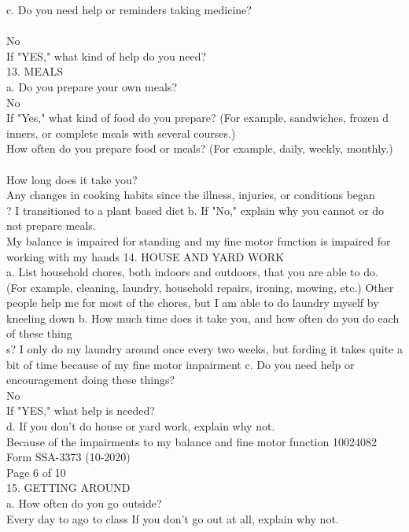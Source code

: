 \documentclass[12pt]{article}
\begin{document}
c. Do you need help or reminders taking medicine?\\\\
No\\
If "YES," what kind of help do you need?\\
13. MEALS\\
a. Do you prepare your own meals?\\
No\\
If "Yes," what kind of food do you prepare? (For example, sandwiches, frozen d\\inners, or complete meals with several courses.)
\\
How often do you prepare food or meals? (For example, daily, weekly, monthly.)\\
\\
How long does it take you?\\
Any changes in cooking habits since the illness, injuries, or conditions began\\?
I transitioned to a plant based diet
b. If "No," explain why you cannot or do not prepare meals.\\
My balance is impaired for standing and my fine motor function is impaired for working with my hands
14. HOUSE AND YARD WORK\\
a. List household chores, both indoors and outdoors, that you are able to do. \\(For example, cleaning, laundry, household repairs, ironing, mowing, etc.)
Other people help me for most of the chores, but I am able to do laundry myself by kneeling down
b. How much time does it take you, and how often do you do each of these thing\\s?
I only do my laundry around once every two weeks, but fording it takes quite a bit of time because of my fine motor impairment
c. Do you need help or encouragement doing these things?\\
No\\
If "YES," what help is needed?\\
d. If you don't do house or yard work, explain why not.\\
Because of the impairments to my balance and fine motor function
10024082\\
Form SSA-3373 (10-2020)\\
Page 6 of 10\\
15. GETTING AROUND\\
a. How often do you go outside?\\
Every day to ago to class
If you don't go out at all, explain why not.\\
\end{document}
